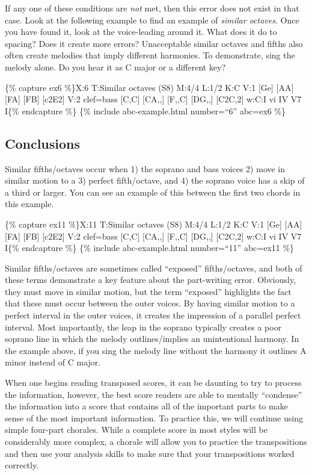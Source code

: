 \documentclass{book}
\begin{document}
If any one of these conditions are \emph{not} met, then this error does not
exist in that case. Look at the following example to find an example of
\emph{similar octaves}. Once you have found it, look at the voice-leading
around it. What does it do to spacing? Does it create more errors?
Unacceptable similar octaves and fifths also often create melodies that imply
different harmonies. To demonstrate, sing the melody alone. Do you hear it as
C major or a different key?

\{\% capture ex6 \%\}X:6 T:Similar octaves (S8) M:4/4 L:1/2 K:C V:1 {[}Ge{]}
{[}AA{]}\textbar{} {[}FA{]} {[}FB{]}\textbar{} {[}c2E2{]}\textbar{]} V:2
clef=bass {[}C,C{]} {[}CA,,{]}\textbar{} {[}F,,C{]} {[}DG,,{]}\textbar{}
{[}C2C,2{]}\textbar{]} w:C:I vi IV V7 I\{\% endcapture \%\} \{\% include
abc-example.html number=``6'' abc=ex6 \%\}

\hypertarget{conclusions-46}{%
\subsection{Conclusions}\label{conclusions-46}}

Similar fifths/octaves occur when 1) the soprano and bass voices 2) move in
similar motion to a 3) perfect fifth/octave, and 4) the soprano voice has a
skip of a third or larger. You can see an example of this between the first
two chords in this example.

\{\% capture ex11 \%\}X:11 T:Similar octaves (S8) M:4/4 L:1/2 K:C V:1 {[}Ge{]}
{[}AA{]}\textbar{} {[}FA{]} {[}FB{]}\textbar{} {[}c2E2{]}\textbar{]} V:2
clef=bass {[}C,C{]} {[}CA,,{]}\textbar{} {[}F,,C{]} {[}DG,,{]}\textbar{}
{[}C2C,2{]}\textbar{]} w:C:I vi IV V7 I\{\% endcapture \%\} \{\% include
abc-example.html number=``11'' abc=ex11 \%\}

Similar fifths/octaves are sometimes called ``exposed'' fifths/octaves, and
both of these terms demonstrate a key feature about the part-writing error.
Obviously, they must move in similar motion, but the term ``exposed''
highlights the fact that these must occur between the outer voices. By having
similar motion to a perfect interval in the outer voices, it creates the
impression of a parallel perfect interval. Most importantly, the leap in the
soprano typically creates a poor soprano line in which the melody
outlines/implies an unintentional harmony. In the example above, if you sing
the melody line without the harmony it outlines A minor instead of C major.

When one begins reading transposed scores, it can be daunting to try to
process the information, however, the best score readers are able to mentally
``condense'' the information into a score that contains all of the important
parts to make sense of the most important information. To practice this, we
will continue using simple four-part chorales. While a complete score in most
styles will be considerably more complex, a chorale will allow you to practice
the transpositions and then use your analysis skills to make sure that your
transpositions worked correctly.
\end{document}
